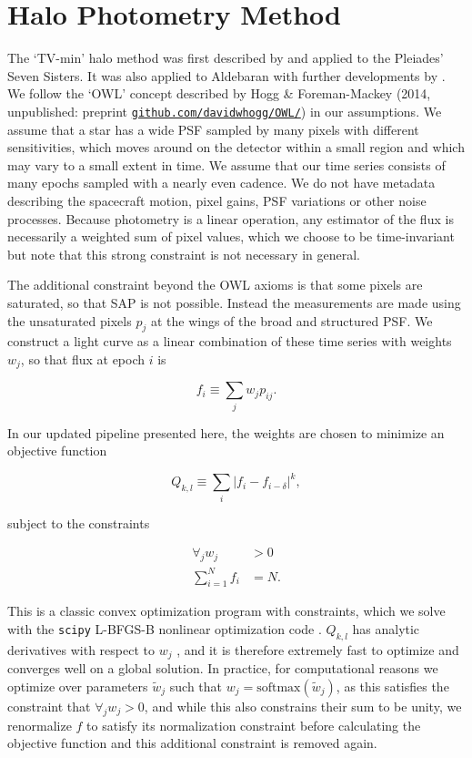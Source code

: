 \documentclass[modern]{aastex62}
\begin{document}
\section{Halo Photometry Method}
\label{method}


The `TV-min' halo method was first described by \citet{White2017} and applied to the Pleiades' Seven Sisters. It was also applied to Aldebaran with further developments by \citet{Farr2018}. We follow the `OWL' concept described by Hogg \&  Foreman-Mackey (2014, unpublished: preprint  \href{https://github.com/davidwhogg/OWL/}{\nolinkurl{github.com/davidwhogg/OWL/}}) in our assumptions. We assume that a star has a wide PSF sampled by many pixels with different sensitivities, which moves around on the detector within a small region and which may vary to a small extent in time. We assume that our time series consists of many epochs sampled with a nearly even cadence. We do not have metadata describing the spacecraft motion, pixel gains, PSF variations or other noise processes. Because photometry is a linear operation, any estimator of the flux is necessarily a weighted sum of pixel values, which we choose to be time-invariant but note that this strong constraint is not necessary in general. 

The additional constraint beyond the OWL axioms is that some pixels are saturated, so that SAP is not possible. Instead the measurements are made using the unsaturated pixels $p_j$ at the wings of the broad and structured PSF. We construct a light curve as a linear combination of these time series with weights $w_j$, so that flux at epoch $i$ is 

\begin{equation}
    f_i \equiv \sum_j {w_j p_{ij}}.
\end{equation}

\noindent In our updated pipeline presented here, the weights are chosen to minimize an objective function

\begin{equation}
    Q_{k,l} \equiv {\sum_i{|f_i - f_{i-\delta}|^k}},
\end{equation}

\noindent subject to the constraints 

\begin{align}
\forall_j w_j &> 0\\
\sum_{i=1}^{N} f_i  &= N.
\end{align}

This is a classic convex optimization program with constraints, which we solve with the \texttt{scipy} \citep{scipy} L-BFGS-B nonlinear optimization code \citep{lbfgsb}. $Q_{k,l}$ has analytic derivatives with respect to $w_j$ \citep[calculated with \texttt{autograd};][]{autograd}, and it is therefore extremely fast to optimize and converges well on a global solution. In practice, for computational reasons we optimize over parameters $\tilde{w}_j$ such that $w_j = \text{softmax}(\tilde{w}_j)$, as this satisfies the constraint that $\forall_j w_j > 0$, and while this also constrains their sum to be unity, we renormalize $f$ to satisfy its normalization constraint before calculating the objective function and this additional constraint is removed again.
\end{document}
